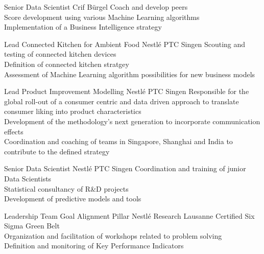 \documentclass{yalcv}
\begin{document}
\begin{cvbody}


	{Senior Data Scientist}
	{Crif Bürgel}
	{Coach and develop peers\\
		Score development using various Machine Learning algorithms\\
		Implementation of a Business Intelligence strategy}

	{Lead Connected Kitchen for Ambient Food}
	{Nestlé PTC Singen}
	{Scouting and testing of connected kitchen devices\\
		Definition of connected kitchen stratgey\\
		Assessment of Machine Learning algorithm possibilities for new business models}

	{Lead Product Improvement Modelling}
	{Nestlé PTC Singen}
	{Responsible for the global roll-out of a consumer centric and data driven approach to translate
		consumer liking into product characteristics\\
		Development of the methodology’s next generation to incorporate communication effects\\
		Coordination and coaching of teams in Singapore, Shanghai and India to contribute to
		the defined strategy}

	{Senior Data Scientist}
	{Nestlé PTC Singen}
	{Coordination and training of junior Data Scientists\\
		Statistical consultancy of R\&D projects\\
		Development of predictive models and tools}

	{Leadership Team Goal Alignment Pillar}
	{Nestlé Research Lausanne}
	{Certified Six Sigma Green Belt\\
		Organization and facilitation of workshops related to problem solving\\
		Definition and monitoring of Key Performance Indicators}


\end{cvbody}
\end{document}
